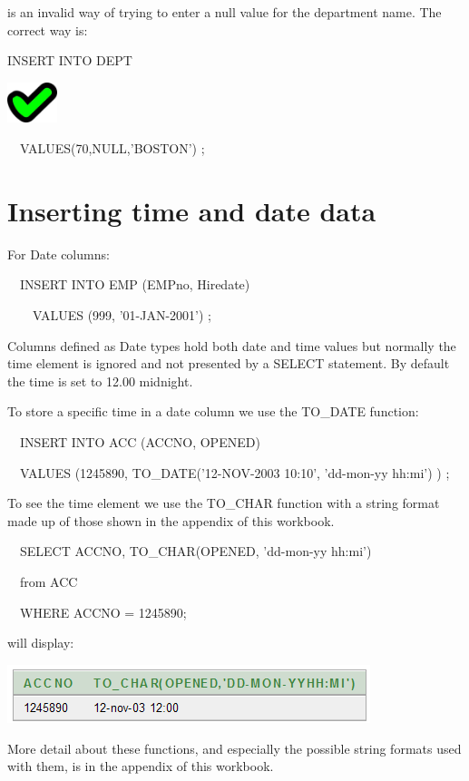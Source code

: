 is an invalid way of trying to enter a null value for the department name.  The correct way is:

INSERT INTO DEPT

\begin{center}
  
\includegraphics[width=1.443cm,height=1.184cm]{images/img (27).png}

\end{center}
\ \ VALUES(70,NULL,'BOSTON') ;

\section{Inserting time and date data}
For Date columns:

\ \ INSERT INTO EMP (EMPno, Hiredate)

\ \ \ \ VALUES (999, '01-JAN-2001') ;

Columns defined as Date types hold both date and time values but normally the time element is ignored and not presented by a SELECT statement.  By default the time is set to 12.00 midnight.

To store a specific time in a date column we use the TO\_DATE function:

\ \ INSERT INTO ACC (ACCNO, OPENED)

\ \ VALUES (1245890, TO\_DATE('12-NOV-2003 10:10', 'dd-mon-yy hh:mi') ) ;

To see the time element we use the TO\_CHAR function with a string format made up of those shown in the appendix of this workbook.

\ \ SELECT ACCNO, TO\_CHAR(OPENED, 'dd-mon-yy hh:mi') 

\ \ from ACC

\ \ WHERE ACCNO = 1245890;

will display:

   
\includegraphics[width=10.576cm,height=1.706cm]{images/img (42).png}
 

More detail about these functions, and especially the possible string formats used with them, is in the appendix of this workbook.

